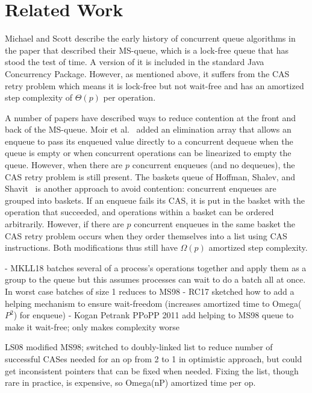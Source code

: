 
\section{Related Work}

Michael and Scott \cite{MS98} describe the early history of concurrent queue algorithms
in the paper that described their MS-queue, which
is a lock-free queue that has stood the test of time.
A version of it is
included in the standard Java Concurrency Package.  %
However, as mentioned above, it suffers from the CAS retry problem
which means it is lock-free but not wait-free and has an amortized step complexity
of $\Theta(p)$ per operation.

A number of papers have described ways to reduce contention at the front
and back of the MS-queue.
Moir et al.~\cite{DBLP:conf/spaa/MoirNSS05} 
added an elimination array that allows an enqueue to pass its enqueued value directly
to a concurrent dequeue when the queue is empty or when concurrent operations 
can be linearized to empty the queue.
However, when there are $p$ concurrent enqueues (and no dequeues), the CAS retry problem
is still present.
The baskets queue of
Hoffman, Shalev, and Shavit~\cite{DBLP:conf/opodis/HoffmanSS07} 
is another approach to avoid contention:  concurrent enqueues are grouped into baskets.
If an enqueue fails its CAS, it is put in the basket with the operation that succeeded,
and operations within a basket can be ordered arbitrarily.
However, if there are $p$ concurrent enqueues in the same basket
the CAS retry problem occurs when they order themselves into a list using CAS instructions.
Both modifications thus still have $\Omega(p)$ amortized step complexity.


- MKLL18 batches several of a process's operations together and apply them as a group to the queue but this assumes processes can wait to do a batch all at once.  In worst case batches of size 1 reduces to MS98
- RC17 sketched how to add a helping mechanism to ensure wait-freedom (increases amortized time to Omega($P^2$) for enqueue)
- Kogan Petrank PPoPP 2011 add helping to MS98 queue to make it wait-free; only makes complexity worse

LS08 modified MS98; switched to doubly-linked list to reduce number of successful CASes needed for an op from 2 to 1 in optimistic approach, but could get inconsistent pointers that can be fixed when needed.  Fixing the list, though rare in practice, is expensive, so Omega(nP) amortized time per op.

